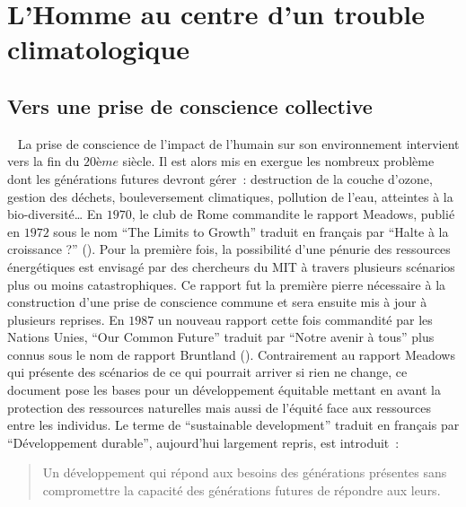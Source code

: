 


\section{L’Homme au centre d’un trouble climatologique} %
\label{sec:l_homme_au_centre_d_un_trouble_climatologique}
\subsection{Vers une prise de conscience collective} %
\label{sub:vers_une_prise_de_conscience_collective}
~
La prise de conscience de l’impact de l’humain sur son environnement intervient vers
la fin du $20ème$ siècle. Il est alors mis en exergue les nombreux problème dont les
générations futures devront gérer~: destruction de la couche d’ozone, gestion des
déchets, bouleversement climatiques, pollution de l’eau, atteintes à la bio-diversité\dots
En $1970$, le club de Rome commandite le rapport Meadows, publié en
$1972$ sous le nom \enquote{The Limits to Growth} traduit en français par
\enquote{Halte à la croissance ?} ().
Pour la première fois, la possibilité d’une pénurie des ressources énergétiques est
envisagé par des chercheurs du MIT à travers plusieurs scénarios plus ou moins
catastrophiques. Ce rapport fut la première pierre nécessaire à la construction d’une
prise de conscience commune et sera ensuite mis à jour à plusieurs reprises.
En $1987$ un nouveau rapport cette fois commandité par
les Nations Unies, \enquote{Our Common Future} traduit par \enquote{Notre avenir à tous}
plus connus sous le nom de rapport Bruntland (). Contrairement
au rapport Meadows qui présente des scénarios de ce qui pourrait arriver si rien ne change,
ce document pose les bases pour un développement équitable mettant en avant
la protection des ressources naturelles mais aussi de l’équité face aux ressources
entre les individus. Le terme de \enquote{sustainable development} traduit en français
par \enquote{Développement durable}, aujourd’hui largement repris, est introduit~:
\blockquote{
    Un développement qui répond aux besoins des générations présentes sans
    compromettre la capacité des générations futures de répondre aux leurs.
}

